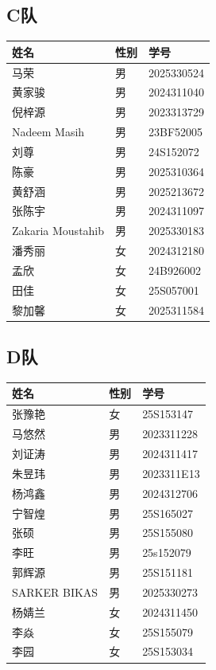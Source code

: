 \documentclass{ctexart}
\begin{document}
\subsection*{C队}
\renewcommand{\arraystretch}{1.2}
\begin{tabularx}{\textwidth}{@{} L{3cm} M{2cm} X @{}}
    \toprule
    \textbf{姓名} & \textbf{性别} & \textbf{学号} \\
    \midrule
    马荣 & 男 & 2025330524 \\
    黄家骏 & 男 & 2024311040 \\
    倪梓源 & 男 & 2023313729 \\
    Nadeem Masih & 男 & 23BF52005 \\
    刘尊 & 男 & 24S152072 \\
    陈豪 & 男 & 2025310364 \\
    黄舒涵 & 男 & 2025213672 \\
    张陈宇 & 男 & 2024311097 \\
    Zakaria Moustahib & 男 & 2025330183 \\
    潘秀丽 & 女 & 2024312180 \\
    孟欣 & 女 & 24B926002 \\
    田佳 & 女 & 25S057001 \\
    黎加馨 & 女 & 2025311584 \\
    \bottomrule
\end{tabularx}

\subsection*{D队}
\renewcommand{\arraystretch}{1.2}
\begin{tabularx}{\textwidth}{@{} L{3cm} M{2cm} X @{}}
    \toprule
    \textbf{姓名} & \textbf{性别} & \textbf{学号} \\
    \midrule
    张豫艳 & 女 & 25S153147 \\
    马悠然 & 男 & 2023311228 \\
    刘证涛 & 男 & 2024311417 \\
    朱昱玮 & 男 & 2023311E13 \\
    杨鸿鑫 & 男 & 2024312706 \\
    宁智煌 & 男 & 25S165027 \\
    张硕 & 男 & 25S155080 \\
    李旺 & 男 & 25s152079 \\
    郭辉源 & 男 & 25S151181 \\
    SARKER BIKAS & 男 & 2025330273 \\
    杨婧兰 & 女 & 2024311450 \\
    李焱 & 女 & 25S155079 \\
    李园 & 女 & 25S153034 \\
    \bottomrule
\end{tabularx}
\end{document}
